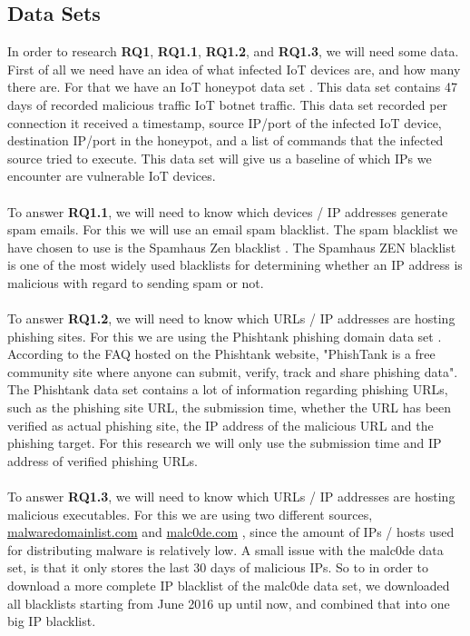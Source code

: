 \documentclass[a4paper,10pt]{article}
\begin{document}
\subsection{Data Sets} \label{sec:methodology:data}
In order to research \textbf{RQ1}, \textbf{RQ1.1}, \textbf{RQ1.2}, and \textbf{RQ1.3}, we will need some data.
First of all we need have an idea of what infected IoT devices are, and how many there are. For that we have
an IoT honeypot data set \cite{iot_honeypot_dataset}. This data set contains 47 days of recorded malicious traffic 
IoT botnet traffic. This data set recorded per connection it received a timestamp, source IP/port of the infected IoT 
device, destination IP/port in the honeypot, and a list of commands that the infected source tried to execute. This 
data set will give us a baseline of which IPs we encounter are vulnerable IoT devices.
\\\\
To answer \textbf{RQ1.1}, we will need to know which devices / IP addresses generate spam emails. For this we
will use an email spam blacklist. The spam blacklist we have chosen to use is the Spamhaus Zen blacklist 
\cite{spamhaus_zen}. The Spamhaus ZEN blacklist is one of the most widely used blacklists for determining whether 
an IP address is malicious with regard to sending spam or not.
\\\\
To answer \textbf{RQ1.2}, we will need to know which URLs / IP addresses are hosting phishing sites. For this we
are using the Phishtank phishing domain data set \cite{phishtank}. According to the FAQ hosted on the Phishtank website,
"PhishTank is a free community site where anyone can submit, verify, track and share phishing data". The Phishtank
data set contains a lot of information regarding phishing URLs, such as the phishing site URL, the submission time,
whether the URL has been verified as actual phishing site, the IP address of the malicious URL and the phishing target.
For this research we will only use the submission time and IP address of verified phishing URLs.
\\\\
To answer \textbf{RQ1.3}, we will need to know which URLs / IP addresses are hosting malicious executables. For 
this we are using two different sources, \url{malwaredomainlist.com} \cite{malwaredomainlist} and 
\url{malc0de.com} \cite{malc0de}, since the amount of IPs / hosts used for distributing malware is relatively
low. A small issue with the malc0de data set, is that it only stores the last 30 days of malicious IPs. So to in order to 
download a more complete IP blacklist of the malc0de data set, we downloaded all blacklists starting from June 2016
up until now, and combined that into one big IP blacklist.
\end{document}
